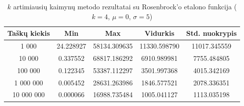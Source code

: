 \begin{table}[H]
    \centering
    \begin{tabular}{|c|c|c|c|c|}
        \hline
        \textbf{Taškų kiekis} & \textbf{Min} & \textbf{Max} & \textbf{Vidurkis} & \textbf{Std. nuokrypis} \\ \hline
        1 000        & 24.228927 & 58134.309635 & 11330.598790 & 11017.345559 \\ \hline
        10 000       & 0.337552 & 68817.186292 & 6910.989981 & 7755.484805 \\ \hline
        100 000      & 0.122345 & 53387.112297 & 3501.997368 & 4015.342169 \\ \hline
        1 000 000    & 0.005452 & 28631.263986 & 1846.577521 & 2078.336351 \\ \hline
        10 000 000   & 0.000066 & 16988.735484 & 1005.041127 & 1113.035198 \\ \hline
    \end{tabular}
    \caption{$k$ artimiausių kaimynų metodo rezultatai su Rosenbrock'o etalono funkcija ($k = 4$, $\mu = 0$, $\sigma = 5$)}
\end{table}